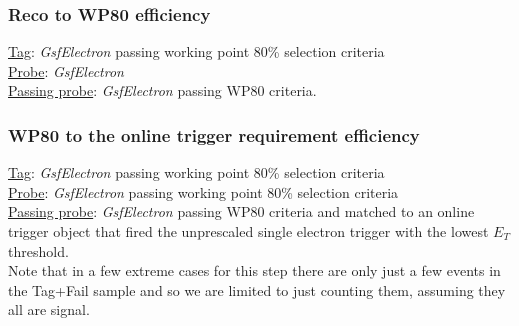 \subsubsection{Reco to WP80 efficiency}
\underline{Tag}: \textit{GsfElectron} passing working point 80\% selection criteria\\
\underline{Probe}:  \textit{GsfElectron} \\
\underline{Passing probe}: \textit{GsfElectron} passing WP80 criteria.\\
\subsubsection{WP80 to the online trigger requirement efficiency}
\underline{Tag}: \textit{GsfElectron} passing working point 80\% selection criteria\\
\underline{Probe}: \textit{GsfElectron} passing working point 80\% selection criteria\\ 
\underline{Passing probe}: \textit{GsfElectron} passing WP80 criteria and matched to an 
online trigger object that fired the unprescaled single electron trigger 
with the lowest $E_T$ threshold.\\

Note that in a few extreme cases for this step there are only just a few events in the
Tag+Fail sample and so we are limited to just counting them, assuming they all are signal.

